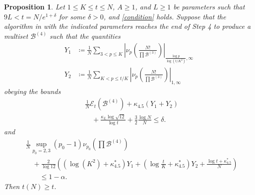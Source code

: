 \documentclass[12pt,a4paper,reqno]{amsart}
\numberwithin{equation}{section}
\theoremstyle{plain}
\newtheorem{proposition}[theorem]{Proposition}
\theoremstyle{definition}
\newcommand\tuple{{\mathcal B}}
\newcommand\excess{{\mathcal{E}}}
\begin{document}
\begin{proposition}\label{balance-23'}  Let $1 \leq K \leq t \leq N$, $A \geq 1$, and $L \geq 1$ be parameters such that $9L < t = N/e^{1+\delta}$ for some $\delta>0$, and \eqref{condition} holds.  Suppose that the algorithm in  with the indicated parameters reaches the end of Step 4 to produce a multiset $\tuple^{(4)}$ such that the quantities
  \begin{align}
    Y_1 &\coloneqq \frac{1}{N} \sum_{3 < p \leq K} \left|\nu_p\left(\frac{N!}{\prod \tuple^{(3)}}\right)\right|_{\frac{\log p}{\log (t/K^2)},\infty}  \label{y1-def}\\
    Y_2 &\coloneqq \frac{1}{N} \sum_{K < p \leq t/K} \left|\nu_p\left(\frac{N!}{\prod \tuple^{(3)}}\right)\right|_{1,\infty}\label{y2-def}
  \end{align}
  obeying the bounds
\begin{equation}\label{new-balance-4}
  \begin{split}
&    \frac{1}{N}  \excess_t(\tuple^{(4)}) + \kappa_{4.5} (Y_1 + Y_2) 
 \\
&\quad  + \frac{\kappa_L \log \sqrt{12}}{\log t}  + \frac{3}{2} \frac{\log N}{N}   \leq \delta. 
  \end{split}
 \end{equation}
and
 \begin{align*}
  &\frac{1}{N} \sup_{p_0=2,3} (p_0-1) \nu_{p_0}\left(\prod \tuple^{(4)}\right)\\
  &\quad + \frac{2}{\log 12}\left( (\log(K^2)+\kappa^*_{4.5}) Y_1 + (\log\frac{t}{K}+\kappa^*_{4.5}) Y_2 + \frac{\log t + \kappa^*_{4.5}}{N} \right) \\
&\quad\quad
  \leq 1 - \alpha.
 \end{align*}
Then $t(N) \geq t$.
\end{proposition}
\end{document}
